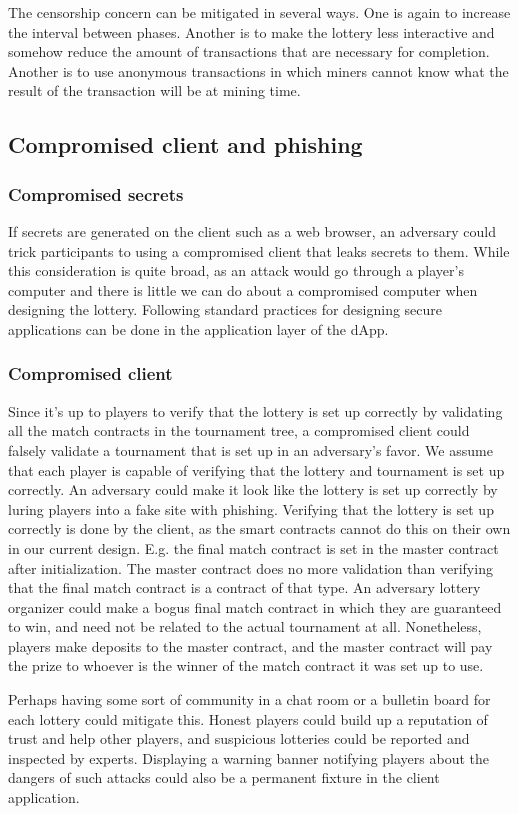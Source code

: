 The censorship concern can be mitigated in several ways. One is again to increase the interval between phases. Another is to make the lottery less interactive and somehow reduce the amount of transactions that are necessary for completion. Another is to use anonymous transactions in which miners cannot know what the result of the transaction will be at mining time.

\subsection{Compromised client and phishing}

\subsubsection{Compromised secrets}
If secrets are generated on the client such as a web browser, an adversary could trick participants to using a compromised client that leaks secrets to them. While this consideration is quite broad, as an attack would go through a player's computer and there is little we can do about a compromised computer when designing the lottery. Following standard practices for designing secure applications can be done in the application layer of the dApp.

\subsubsection{Compromised client}
Since it's up to players to verify that the lottery is set up correctly by validating all the match contracts in the tournament tree, a compromised client could falsely validate a tournament that is set up in an adversary's favor. We assume that each player is capable of verifying that the lottery and tournament is set up correctly. An adversary could make it look like the lottery is set up correctly by luring players into a fake site with phishing. Verifying that the lottery is set up correctly is done by the client, as the smart contracts cannot do this on their own in our current design. E.g. the final match contract is set in the master contract after initialization. The master contract does no more validation than verifying that the final match contract is a contract of that type. An adversary lottery organizer could make a bogus final match contract in which they are guaranteed to win, and need not be related to the actual tournament at all. Nonetheless, players make deposits to the master contract, and the master contract will pay the prize to whoever is the winner of the match contract it was set up to use.

Perhaps having some sort of community in a chat room or a bulletin board for each lottery could mitigate this. Honest players could build up a reputation of trust and help other players, and suspicious lotteries could be reported and inspected by experts. Displaying a warning banner notifying players about the dangers of such attacks could also be a permanent fixture in the client application.
